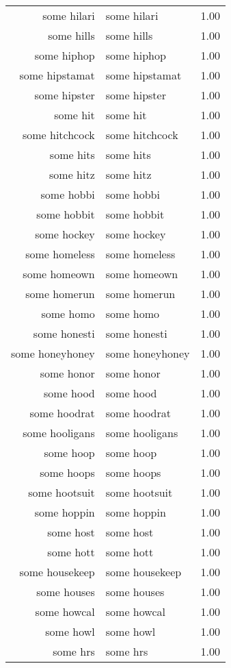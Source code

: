 \begin{table}[ht]
\begin{tabular}{rlr}
  some hilari & some hilari & 1.00 \\ 
  some hills & some hills & 1.00 \\ 
  some hiphop & some hiphop & 1.00 \\ 
  some hipstamat & some hipstamat & 1.00 \\ 
  some hipster & some hipster & 1.00 \\ 
  some hit & some hit & 1.00 \\ 
  some hitchcock & some hitchcock & 1.00 \\ 
  some hits & some hits & 1.00 \\ 
  some hitz & some hitz & 1.00 \\ 
  some hobbi & some hobbi & 1.00 \\ 
  some hobbit & some hobbit & 1.00 \\ 
  some hockey & some hockey & 1.00 \\ 
  some homeless & some homeless & 1.00 \\ 
  some homeown & some homeown & 1.00 \\ 
  some homerun & some homerun & 1.00 \\ 
  some homo & some homo & 1.00 \\ 
  some honesti & some honesti & 1.00 \\ 
  some honeyhoney & some honeyhoney & 1.00 \\ 
  some honor & some honor & 1.00 \\ 
  some hood & some hood & 1.00 \\ 
  some hoodrat & some hoodrat & 1.00 \\ 
  some hooligans & some hooligans & 1.00 \\ 
  some hoop & some hoop & 1.00 \\ 
  some hoops & some hoops & 1.00 \\ 
  some hootsuit & some hootsuit & 1.00 \\ 
  some hoppin & some hoppin & 1.00 \\ 
  some host & some host & 1.00 \\ 
  some hott & some hott & 1.00 \\ 
  some housekeep & some housekeep & 1.00 \\ 
  some houses & some houses & 1.00 \\ 
  some howcal & some howcal & 1.00 \\ 
  some howl & some howl & 1.00 \\ 
  some hrs & some hrs & 1.00 \\ 

\end{tabular}
\end{table}

